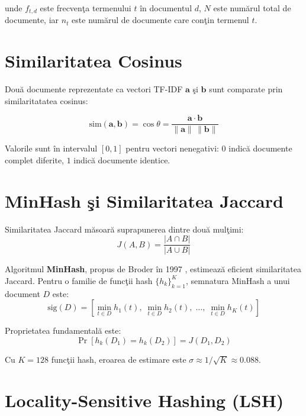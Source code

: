 \documentclass[a4paper,12pt]{report}
\begin{document}
unde $f_{t,d}$ este frecven\c{t}a termenului $t$ \^{i}n documentul $d$, $N$ este num\u{a}rul total de documente, iar $n_t$ este num\u{a}rul de documente care con\c{t}in termenul $t$.

\section{Similaritatea Cosinus}

Dou\u{a} documente reprezentate ca vectori TF-IDF $\mathbf{a}$ \c{s}i $\mathbf{b}$ sunt comparate prin similaritatatea cosinus:

\begin{equation}
  \text{sim}(\mathbf{a}, \mathbf{b}) = \cos\theta = \frac{\mathbf{a} \cdot \mathbf{b}}{\|\mathbf{a}\|\,\|\mathbf{b}\|}
\label{eq:cosine}
\end{equation}

Valorile sunt \^{i}n intervalul $[0, 1]$ pentru vectori nenegativi: $0$ indic\u{a} documente complet diferite, $1$ indic\u{a} documente identice.

\section{MinHash \c{s}i Similaritatea Jaccard}

Similaritatea Jaccard m\u{a}soar\u{a} suprapunerea dintre dou\u{a} mul\c{t}imi:
\begin{equation}
  J(A,B) = \frac{|A \cap B|}{|A \cup B|}
\label{eq:jaccard}
\end{equation}

Algoritmul \textbf{MinHash}, propus de Broder \^{i}n 1997 \cite{broder1997}, estimeaz\u{a} eficient similaritatea Jaccard. Pentru o familie de func\c{t}ii hash $\{h_k\}_{k=1}^{K}$, semnatura MinHash a unui document $D$ este:
\begin{equation}
  \text{sig}(D) = \left[\min_{t \in D} h_1(t),\; \min_{t \in D} h_2(t),\; \ldots,\; \min_{t \in D} h_K(t)\right]
\label{eq:minhash}
\end{equation}

Proprietatea fundamental\u{a} este:
\begin{equation}
  \Pr\!\left[h_k(D_1) = h_k(D_2)\right] = J(D_1, D_2)
\label{eq:minhash_prob}
\end{equation}

Cu $K = 128$ func\c{t}ii hash, eroarea de estimare este $\sigma \approx 1/\sqrt{K} \approx 0.088$.

\section{Locality-Sensitive Hashing (LSH)}
\end{document}
